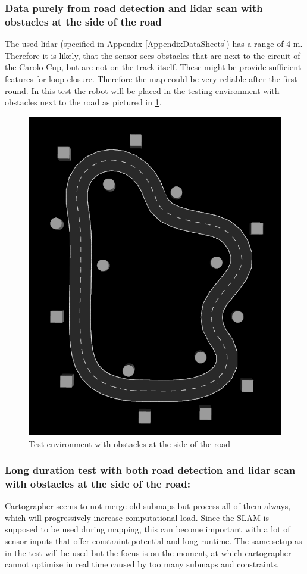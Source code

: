 \subsubsection{Data purely from road detection and lidar scan with obstacles at the side of the road}
The used lidar (specified in Appendix \ref{AppendixDataSheets}) has a range of 4 m. Therefore it is likely, that the sensor sees obstacles that are next to the circuit of the Carolo-Cup, but are not on the track itself. These might be provide sufficient features for loop closure. Therefore the map could be very reliable after the first round. 
In this test the robot will be placed in the testing environment with obstacles next to the road as pictured in \ref{2slamtestenv}.

\begin{figure} 
\centering
	\includegraphics[width=.4\textwidth]{Pictures/2slamtest}
	\caption{Test environment with obstacles at the side of the road}
	\label{2slamtestenv}
\end{figure}

\subsubsection{Long duration test with both road detection and lidar scan with obstacles at the side of the road:}
Cartographer seems to not merge old submaps but process all of them always, which will progressively increase computational load. Since the SLAM is supposed to be used during mapping, this can become important with a lot of sensor inputs that offer constraint potential and long runtime.
The same setup as in the  test will be used but the focus is on the moment, at which cartographer cannot optimize in real time caused by too many submaps and constraints.\\


